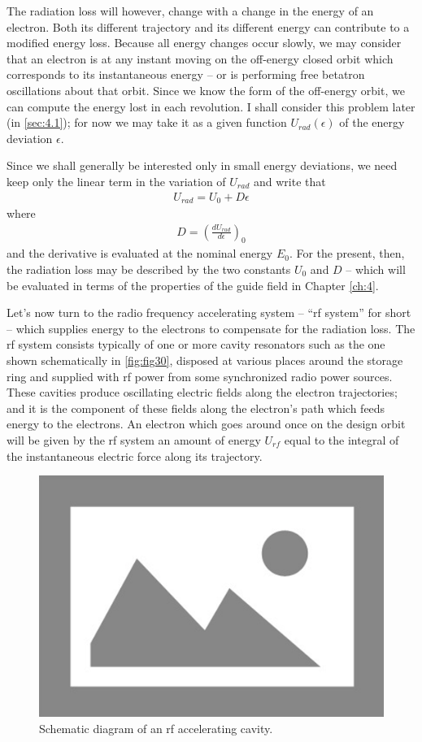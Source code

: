 The radiation loss will however, change with a change in the energy of an electron. Both its different trajectory and its different energy can contribute to a modified energy loss. Because all energy changes occur slowly, we may consider that an electron is at any instant moving on the off-energy closed orbit which corresponds to its instantaneous energy -- or is performing free betatron oscillations about that orbit. Since we know the form of the off-energy orbit, we can compute the energy lost in each revolution. I shall consider this problem later (in \autoref{sec:4.1}); for now we may take it as a given function $U_{rad}(\epsilon)$ of the energy deviation $\epsilon$.

Since we shall generally be interested only in small energy deviations, we need keep only the linear term in the variation of $U_{rad}$ and write that
\begin{align}
	U_{rad} = U_0 + D\epsilon\label{eq:3.23}
\end{align}
where
\begin{align} \label{eq:3.24}
	D = \left(\frac{dU_{rad}}{d\epsilon}\right)_0
\end{align}
and the derivative is evaluated at the nominal energy $E_0$. For the present, then, the radiation loss may be described by the two constants $U_0$ and $D$ -- which will be evaluated in terms of the properties of the guide field in Chapter \ref{ch:4}.

Let's now turn to the radio frequency accelerating system -- “rf system” for short -- which supplies energy to the electrons to compensate for the radiation loss. The rf system consists typically of one or more cavity resonators such as the one shown schematically in \autoref{fig:fig30}, disposed at various places around the storage ring
and supplied with rf power from some synchronized radio power sources. These cavities produce oscillating electric fields along the electron trajectories; and it is the component of these fields along the electron's path which feeds energy to the electrons. An electron which goes around once on the design orbit will be given by the rf system an amount of energy $U_{rf}$ equal to the integral of the instantaneous electric force along its trajectory.
 
 \begin{figure}[!htb]
 	\centering
 	\includegraphics[width=0.7\linewidth]{./Figuras/placeholder.png}
 	\caption{Schematic diagram of an rf accelerating cavity.}
 	\label{fig:fig30}
 \end{figure}
 
